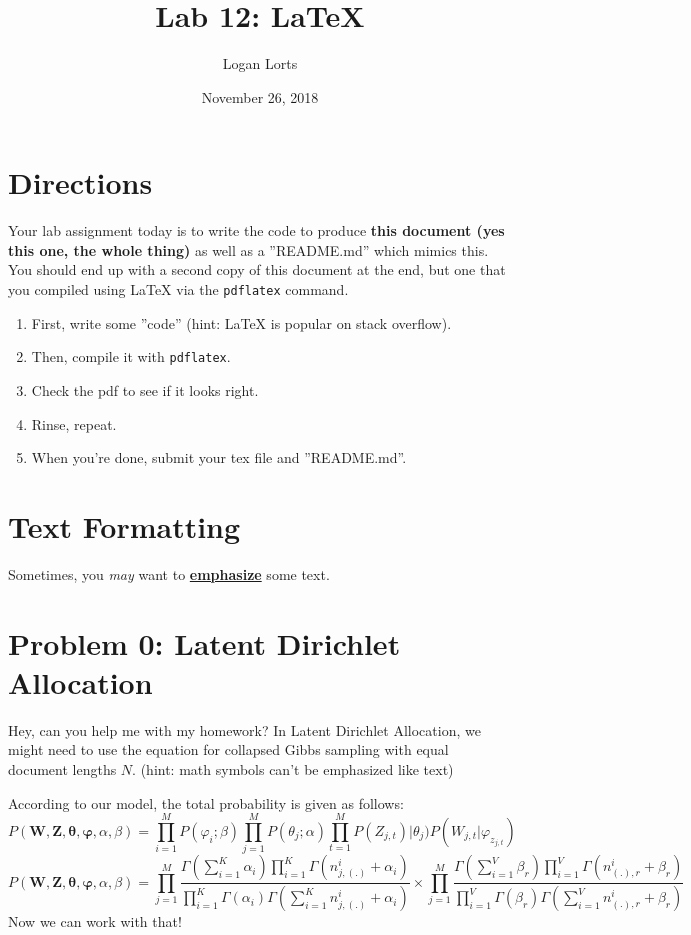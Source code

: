 \documentclass{article}
\title{Lab 12: \LaTeX{}}
\author{Logan Lorts}
\date{November 26, 2018}
\begin{document}
\maketitle

\section*{Directions}
Your lab assignment today is to write the code to produce \textbf{this document (yes this one, the whole thing)} as well as a ”README.md” which mimics this. You should end up with a second copy of this document at the end, but one that you compiled using \LaTeX{} via the \texttt{pdflatex} command.
\begin{enumerate}
    \item{First, write some ”code” (hint: \LaTeX{} is popular on stack overflow).}
    \item{Then, compile it with \texttt{pdflatex}.}
    \item{Check the pdf to see if it looks right.}
    \item{Rinse, repeat.}
    \item{When you’re done, submit your tex file and ”README.md”.}
\end{enumerate}

\section*{Text Formatting}
Sometimes, you \textit{may} want to \textbf{\underline{emphasize}} some text.

\section*{Problem 0: Latent Dirichlet Allocation}
Hey, can you help me with my homework? In Latent Dirichlet Allocation, we might need to use the equation for collapsed Gibbs sampling with equal document lengths $N$. (hint: math symbols can’t be emphasized like text)

According to our model, the total probability is given as follows:
\begin{equation}
P(\bm{W},\bm{Z},\bm{\theta},\bm{\varphi},\alpha,\beta)=\prod_{i=1}^{M}P(\varphi_i;\beta)\prod_{j=1}^{M}P(\theta_j;\alpha)\prod_{t=1}^{M}P(Z_{j,t})|\theta_j)P(W_{j,t}|\varphi_{z_{j,t}})
\end{equation}
\begin{equation}
P(\bm{W},\bm{Z},\bm{\theta},\bm{\varphi},\alpha,\beta)=\prod_{j=1}^{M}\frac{\Gamma(\sum_{i=1}^K\alpha_i)\prod_{i=1}^K\Gamma(n_{j,(.)}^i+\alpha_i)}{\prod_{i=1}^K\Gamma(\alpha_i)\Gamma(\sum_{i=1}^Kn_{j,(.)}^i+\alpha_i)}\times\prod_{j=1}^{M}\frac{\Gamma(\sum_{i=1}^V\beta_r)\prod_{i=1}^V\Gamma(n_{(.),r}^i+\beta_r)}{\prod_{i=1}^V\Gamma(\beta_r)\Gamma(\sum_{i=1}^Vn_{(.),r}^i+\beta_r)}
\end{equation}
Now we can work with that!
\end{document}
